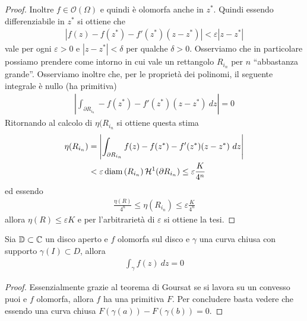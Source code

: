 \begin{proof}
	Inoltre $f \in \mathcal{O}(\Omega)$ e quindi è olomorfa anche in $z^*$. Quindi essendo differenziabile in $z^*$ si ottiene che 
	\begin{equation*}
	\begin{aligned}
	|f(z) - f(z^*) - f'(z^*)(z-z^*)| < \varepsilon|z - z^*|
	\end{aligned}
	\end{equation*}
	vale per ogni $\varepsilon > 0$ e $|z - z^*| < \delta$ per qualche $\delta > 0$. Osserviamo che in particolare possiamo prendere come intorno in cui vale un rettangolo $R_{i_n}$ per $n$ ``abbastanza grande''. Osserviamo inoltre che, per le proprietà dei polinomi, il seguente integrale è nullo (ha primitiva)
	\begin{equation*}
	\begin{aligned}
		\left|\int_{\partial R_{i_n}} - f(z^*) - f'(z^*)(z-z^*)\ dz\right| = 0 
	\end{aligned}
	\end{equation*}
	Ritornando al calcolo di $\eta({R_{i_n}}$ si ottiene questa stima
	\begin{align*}
	\eta(R_{i_n}) & = \left|\int_{\partial R_{i_n}} f(z) - f(z^*) - f'(z^*)(z-z^*)\ dz \right| \\
				  & < \varepsilon \operatorname{diam}\left(R_{i_n}\right) \mathcal{H}^1(\partial R_{i_n}) \le \varepsilon \frac{K}{4^n} 
	\end{align*}
	ed essendo
	\begin{equation*}
	\begin{aligned}
	\frac{\eta(R)}{4^n} \le \eta(R_{i_n}) \le \varepsilon \frac{K}{4^n}
	\end{aligned}
	\end{equation*}
	allora $\eta(R) \le \varepsilon K$ e per l'arbitrarietà di $\varepsilon$ si ottiene la tesi.
\end{proof}

\begin{theorem}
	\label{thr:cauchy-integrale}
	Sia $\mathbb{D} \subset \mathbb{C}$ un disco aperto e $f$ olomorfa sul disco e $\gamma$ una curva chiusa con supporto $\gamma(I) \subset D$, allora 
	\begin{equation*}
	\begin{aligned}
		\int_\gamma f(z)\ dz = 0
	\end{aligned}
	\end{equation*}
\end{theorem}
\begin{proof}
	Essenzialmente grazie al teorema di Goursat se si lavora su un convesso puoi e $f$ olomorfa, allora $f$ ha una primitiva $F$. Per concludere basta vedere che essendo una curva chiusa $F(\gamma(a)) - F(\gamma(b)) = 0$. 
\end{proof}

